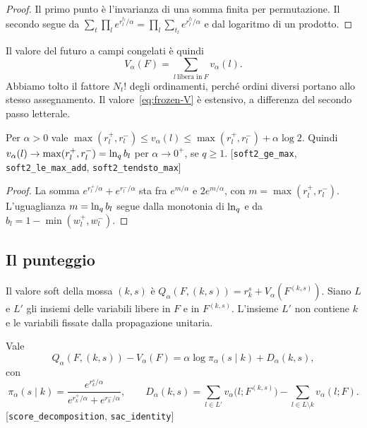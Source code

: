 \begin{proof}
Il primo punto è l'invarianza di una somma finita per permutazione.
Il secondo segue da $\sum_t\prod_le^{r_l^{t_l}/\alpha}=\prod_l\sum_{t_l}e^{r_l^{t_l}/\alpha}$ e dal logaritmo di un prodotto.
\end{proof}

Il valore del futuro a campi congelati è quindi
\begin{equation}
V_\alpha(F)=\sum_{l\ \text{libera in}\ F}v_\alpha(l).
\label{eq:frozen-V}
\end{equation}
Abbiamo tolto il fattore $N_t!$ degli ordinamenti, perché ordini diversi portano allo stesso assegnamento.
Il valore~\eqref{eq:frozen-V} è estensivo, a differenza del secondo passo letterale.

\begin{proposizione}
\label{prop:site-limit}
Per $\alpha>0$ vale $\max(r_l^+,r_l^-)\le v_\alpha(l)\le\max(r_l^+,r_l^-)+\alpha\log2$.
Quindi $v_\alpha(l)\to\max(r_l^+,r_l^-)=\ln_q b_l$ per $\alpha\to0^+$, se $q\ge1$.
[\texttt{soft2\_ge\_max}, \texttt{soft2\_le\_max\_add}, \texttt{soft2\_tendsto\_max}]
\end{proposizione}

\begin{proof}
La somma $e^{r_l^+/\alpha}+e^{r_l^-/\alpha}$ sta fra $e^{m/\alpha}$ e $2e^{m/\alpha}$, con $m=\max(r_l^+,r_l^-)$.
L'uguaglianza $m=\ln_q b_l$ segue dalla monotonia di $\ln_q$ e da $b_l=1-\min(w_l^+,w_l^-)$.
\end{proof}

\subsection{Il punteggio}

Il valore soft della mossa $(k,s)$ è $Q_\alpha(F,(k,s))=r_k^s+V_\alpha(F^{(k,s)})$.
Siano $L$ e $L'$ gli insiemi delle variabili libere in $F$ e in $F^{(k,s)}$.
L'insieme $L'$ non contiene $k$ e le variabili fissate dalla propagazione unitaria.

\begin{proposizione}
\label{prop:score}
Vale
\begin{equation}
Q_\alpha(F,(k,s))-V_\alpha(F)=\alpha\log\pi_\alpha(s\mid k)+D_\alpha(k,s),
\label{eq:score}
\end{equation}
con
\begin{equation}
\pi_\alpha(s\mid k)=\frac{e^{r_k^s/\alpha}}{e^{r_k^+/\alpha}+e^{r_k^-/\alpha}},\qquad
D_\alpha(k,s)=\sum_{l\in L'}v_\alpha\bigl(l;F^{(k,s)}\bigr)-\sum_{l\in L\setminus k}v_\alpha(l;F).
\label{eq:D}
\end{equation}
[\texttt{score\_decomposition}, \texttt{sac\_identity}]
\end{proposizione}

